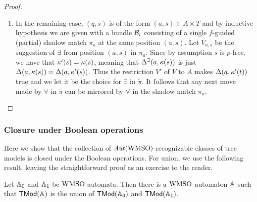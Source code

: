\begin{proof}
\begin{enumerate}[label = (\Alph*), ref = \Alph*]
\begin{enumerate}[label = (\roman*), ref = \roman*]
  \end{enumerate}
  \item In the remaining case, $(q,s)$ is of the form $(a,s) \in A \times T$ and by inductive hypothesis we are given with a bundle $\mathcal{B}_i$ consisting of a single $f$-guided (partial) shadow match $\pi_a$ at the same position $(a,s)$. Let $V_{a,s}$ be the suggestion of $\exists$ from position $(a,s)$ in $\pi_a$. Since by assumption $s$ is $p$-free, we have that $\kappa'(s) = \kappa(s)$, meaning that $\Delta^\exists(a,\kappa(s))$ is just $\Delta(a,\kappa(s)) = \Delta(a,\kappa'(s))$. Thus the restriction $V'$ of $V$ to $A$ makes $\Delta(a,\kappa'(t))$ true and we let it be the choice for $\exists$ in $\tilde{\pi}$. It follows that any next move made by $\forall$ in $\tilde{\pi}$ can be mirrored by $\forall$ in the shadow match $\pi_a$.
\end{enumerate}
\end{proof}


\subsubsection{Closure under Boolean operations}

Here we show that the collection of $\mathit{Aut}(\mathrm{WMSO})$-recognizable classes of tree
models is closed under the Boolean operations.
%
For union, we use the following result, leaving the straightforward proof as an 
exercise to the reader.

\begin{lemma}
\label{t:cl-dis}
Let $\mathbb{A}_{0}$ and $\mathbb{A}_{1}$ be $\mathrm{WMSO}$-automata.
Then there is a $\mathrm{WMSO}$-automaton $\mathbb{A}$ such that $\mathsf{TMod}(\mathbb{A})$ is the
union of $\mathsf{TMod}(\mathbb{A}_{0})$ and $\mathsf{TMod}(\mathbb{A}_{1})$.
\end{lemma}

